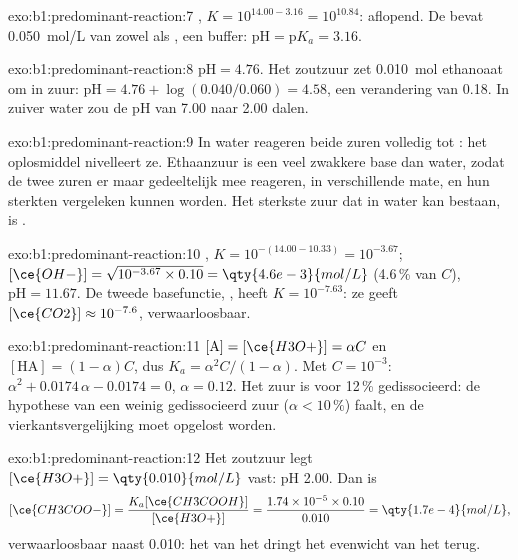 \begin{solution}{exo:b1:predominant-reaction:7}
, $K = 10^{14.00 - 3.16} = 10^{10.84}$: aflopend.
De  bevat \qty{0.050}{mol/L} van zowel  als
, een buffer: $\mathrm{pH} = \mathrm{p}K_a = 3.16$.
\end{solution}

\begin{solution}{exo:b1:predominant-reaction:8}
$\mathrm{pH} = 4.76$. Het zoutzuur zet \qty{0.010}{mol} ethanoaat om in
zuur: $\mathrm{pH} = 4.76 + \log(0.040/0.060) = 4.58$, een verandering
van 0.18. In zuiver water zou de pH van 7.00 naar 2.00 dalen.
\end{solution}

\begin{solution}{exo:b1:predominant-reaction:9}
In water reageren beide zuren volledig tot : het oplosmiddel
nivelleert ze. Ethaanzuur is een veel zwakkere base dan water, zodat de
twee zuren er maar gedeeltelijk mee reageren, in verschillende mate, en
hun sterkten vergeleken kunnen worden. Het sterkste zuur dat in water
kan bestaan, is .
\end{solution}

\begin{solution}{exo:b1:predominant-reaction:10}
, $K = 10^{-(14.00 - 10.33)} = 10^{-3.67}$;
$[\ce{OH-}] = \sqrt{10^{-3.67} \times 0.10} = \qty{4.6e-3}{mol/L}$ (4.6\,\%
van $C$), $\mathrm{pH} = 11.67$. De tweede basefunctie, , heeft $K = 10^{-7.63}$: ze geeft $[\ce{CO2}] \approx
10^{-7.6}$, verwaarloosbaar.
\end{solution}

\begin{solution}{exo:b1:predominant-reaction:11}
$[\mathrm{A}] = [\ce{H3O+}] = \alpha C$ en $[\mathrm{HA}] = (1 - \alpha)C$,
dus $K_a = \alpha^2C/(1 - \alpha)$. Met $C = 10^{-3}$: $\alpha^2 +
0.0174\,\alpha - 0.0174 = 0$, $\alpha = 0.12$. Het zuur is voor 12\,\%
gedissocieerd: de hypothese van een weinig gedissocieerd zuur ($\alpha <
10\,\%$) faalt, en de vierkantsvergelijking moet opgelost worden.
\end{solution}

\begin{solution}{exo:b1:predominant-reaction:12}
Het zoutzuur legt $[\ce{H3O+}] = \qty{0.010}{mol/L}$ vast: pH 2.00. Dan
is
\[
  [\ce{CH3COO-}] = \frac{K_a[\ce{CH3COOH}]}{[\ce{H3O+}]} = \frac{1.74 \times 10^{-5}
  \times 0.10}{0.010} = \qty{1.7e-4}{mol/L},
\]
verwaarloosbaar naast 0.010: het
 van het  dringt het evenwicht van het 
terug.
\end{solution}

